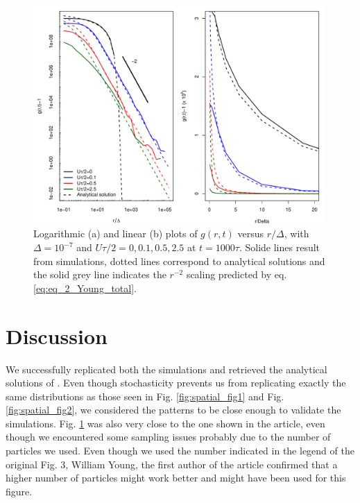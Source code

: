 \begin{figure}[H]
\begin{center}
 \includegraphics[width=0.99\textwidth]{../code/figure/pcf_per_Utot_dx10m8.pdf}
 \caption{Logarithmic (a) and linear (b) plots of $g(r,t)$ versus $r/\Delta$, with $\Delta=10^{-7}$ and $U\tau/2=0,0.1,0.5,2.5$ at $t=1000\tau$. Solide lines result from simulations, dotted lines correspond to analytical solutions and the solid grey line indicates the $r^{-2}$ scaling predicted by eq. \ref{eq:eq_2_Young_total}.}
  \label{fig:pcf_Fig3}
\end{center}
  \end{figure} 
 
\section*{Discussion}

We successfully replicated both the simulations and retrieved the analytical solutions of \citep{young_reproductive_2001}. Even though stochasticity prevents us from replicating exactly the same distributions as those seen in Fig. \ref{fig:spatial_fig1} and Fig. \ref{fig:spatial_fig2}, we considered the patterns to be close enough to validate the simulations. Fig. \ref{fig:pcf_Fig3} was also very close to the one shown in the article, even though we encountered some sampling issues probably due to the number of particles we used. Even though we used the number indicated in the legend of the original Fig. 3, William Young, the first author of the article confirmed that a higher number of particles might work better and might have been used for this figure.\\

